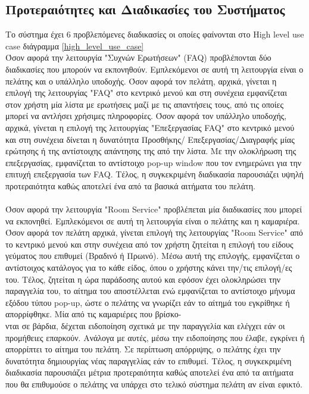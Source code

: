 \subsection{Προτεραιότητες και Διαδικασίες του Συστήματος}
Το σύστημα έχει 6 προβλεπόμενες διαδικασίες οι οποίες φαίνονται στο  High level use case 
διάγραμμα \ref{high_level_use_case}  \\

\noindent
Όσον αφορά την λειτουργία "Συχνών Ερωτήσεων" (FAQ) προβλέπονται δύο διαδικασίες που μπορούν να 
εκπονηθούν. Εμπλεκόμενοι σε αυτή τη λειτουργία είναι ο πελάτης και ο υπάλληλο υποδοχής. Όσον αφορά 
τον πελάτη, αρχικά, γίνεται η επιλογή της λειτουργίας "FAQ" στο κεντρικό μενού και στη συνέχεια 
εμφανίζεται στον χρήστη μία λίστα με ερωτήσεις μαζί με τις απαντήσεις τους, από τις οποίες μπορεί να 
αντλήσει χρήσιμες πληροφορίες. Όσον αφορά τον υπάλληλο υποδοχής, αρχικά, γίνεται η επιλογή της 
λειτουργίας "Επεξεργασίας FAQ" στο κεντρικό μενού και στη συνέχεια δίνεται η δυνατότητα Προσθήκης/
Επεξεργασίας/Διαγραφής μίας ερώτησης ή της αντίστοιχης απάντησης της από την λίστα. Με την 
ολοκλήρωση  της επεξεργασίας, εμφανίζεται το αντίστοιχο  pop-up window που τον ενημερώνει για 
την επιτυχή επεξεργασία των FAQ. Τέλος, η συγκεκριμένη διαδικασία παρουσιάζει υψηλή προτεραιότητα
καθώς αποτελεί ένα από τα βασικά αιτήματα του πελάτη.\\ \\


\noindent 
Όσον αφορά την λειτουργία "Room Service" προβλέπεται μία διαδικασίες που μπορεί να εκπονηθεί.
Εμπλεκόμενοι σε αυτή τη λειτουργία είναι ο πελάτης και η καμαριέρα. Όσον αφορά τον πελάτη αρχικά,
γίνεται επιλογή της λειτουργίας "Room Service" από το κεντρικό μενού και στην συνέχεια από τον χρήστη
ζητείται η επιλογή του είδους γεύματος που επιθυμεί (Βραδινό ή Πρωινό). Μέσω αυτή της επιλογής, 
εμφανίζεται ο αντίστοιχος κατάλογος για το κάθε είδος, όπου ο χρήστης κάνει την/τις  επιλογή/ες του. 
Τέλος,  ζητείται η ώρα παράδοσης αυτού και εφόσον έχει ολοκληρώσει την παραγγελία του, το αίτημα 
του αποστέλλεται ενώ εμφανίζεται το αντίστοιχο μήνυμα εξόδου τύπου pop-up, ώστε ο πελάτης να 
γνωρίζει εάν το αίτημά του εγκρίθηκε ή απορρίφθηκε.  Μία από τις καμαριέρες που βρίσκο-\\νται σε 
βάρδια, δέχεται ειδοποίηση σχετικά με την παραγγελία και ελέγχει εάν οι προμήθειες επαρκούν. 
Ανάλογα με αυτές, μέσω την ειδοποίησης που έλαβε, εγκρίνει ή απορρίπτει το αίτημα του πελάτη. Σε  
περίπτωση απόρριψης, ο πελάτης έχει την δυνατότητα δημιουργίας νέας παραγγελίας εάν το επιθυμεί.
Τέλος, η συγκεκριμένη διαδικασία παρουσιάζει μέτρια προτεραιότητα καθώς αποτελεί ένα από τα 
αιτήματα που θα επιθυμούσε ο πελάτης να υπάρχει στο τελικό σύστημα πελάτη αν είναι εφικτό.\\ \\

